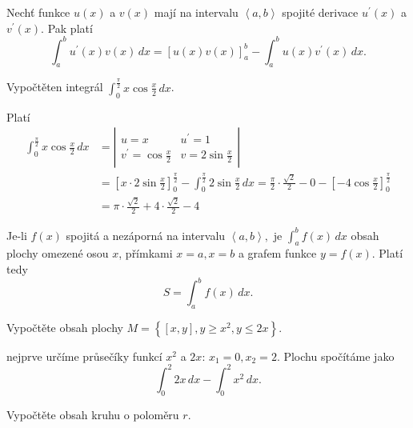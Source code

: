 \begin{veta}
Nechť funkce $u(x)$ a $v(x)$ mají na intervalu $\left < a,b \right > $ spojité derivace
$u^\prime (x)$ a $v^\prime (x)$. Pak platí
$$\int_a ^b u^\prime (x)v(x)\, dx = \left [ u(x)v(x) \right ]_a^b -\int _a^b u(x)v^\prime(x)\,dx.$$
\end{veta}

\begin{priklad}
Vypočtěten integrál $\int _0^{\frac{\pi}{2}}x \cos \frac{x}{2}\, dx$.
\end{priklad}

\begin{reseni}
Platí
\begin{align*}
\int _0^{\frac{\pi}{2}}x \cos \frac{x}{2}\, dx &= \left | \begin{array}{ll}
    u=x & u^\prime = 1 \\
    v^\prime = \cos \frac{x}{2} & v = 2\sin \frac{x}{2}
\end{array}   \right | \\
& =\left [ x\cdot2\sin \frac{x}{2} \right ]_0^{\frac{\pi}{2}}-\int_0^{\frac{\pi}{2}}2\sin \frac{x}{2}\, dx =\frac{\pi}{2}\cdot \frac{\sqrt{2} }{2}-0-\left [ -4\cos \frac{x}{2} \right ]_0^{\frac{\pi}{2}}\\
&= \pi \cdot \frac{\sqrt{2} }{2}+4\cdot \frac{\sqrt{2} }{2}-4
\end{align*}
\end{reseni}

\begin{pozn}
    Je-li $f(x)$ spojitá a nezáporná na intervalu $\left < a,b \right > ,$ je
    $\int_a ^b f(x)\, dx$ obsah plochy omezené osou $x$, přímkami $x=a, x=b$ a
    grafem funkce $y=f(x)$. Platí tedy
    $$S=\int_a^b f(x)\, dx.$$
\end{pozn}

\begin{priklad}
Vypočtěte obsah plochy $M=\left \{ [x,y], y \geq  x^2 , y \leq 2x\right \} $.
\end{priklad}

\begin{reseni}
nejprve určíme průsečíky funkcí $x^2$ a $2x$: $x_1=0,x_2=2$. Plochu spočítáme
jako
$$\int_0^2 2x\, dx - \int_0^2 x^2 \, dx.$$
\end{reseni}

\begin{priklad}
Vypočtěte obsah kruhu o poloměru $r$.
\end{priklad}

